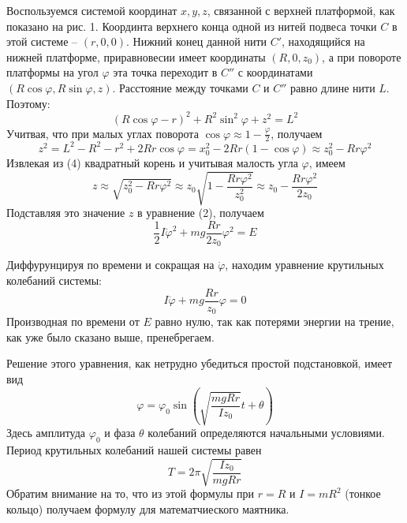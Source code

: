 \documentclass[a4paper,12pt]{article} %
\begin{document}
Воспользуемся системой координат $x, y, z$, связанной с верхней платформой, как показано на рис. 1. Координта верхнего конца одной из нитей подвеса точки $C$ в этой системе -- $(r, 0, 0)$. Нижний конец данной нити $C'$, находящийся на нижней платформе, приравновесии имеет координаты $(R, 0, z_0)$, а при повороте платформы на угол $\varphi$ эта точка переходит в $C''$ с координатами $(R\cos\varphi, R\sin\varphi, z)$. Расстояние между точками $C$ и $C''$ равно длине нити $L$. Поэтому:
\begin{equation}
(R\cos\varphi-r)^2 + R^2\sin^2\varphi + z^2 = L^2
\end{equation}
Учитвая, что при малых углах поворота $\cos\varphi\approx 1 - \frac{\varphi}{2}$, получаем 
\begin{equation}
z^2 = L^2 - R^2 - r^2 + 2Rr\cos\varphi = x_0^2 - 2Rr(1-\cos\varphi) \approx z_0^2 - Rr\varphi^2
\end{equation}
Извлекая из (4) квадратный корень и учитывая малость угла $\varphi$, имеем
\begin{equation}
z \approx \sqrt{z_0^2 - Rr\varphi^2}\approx z_0\sqrt{1 - \frac{Rr\varphi^2}{z_0^2}}\approx z_0 - \frac{Rr\varphi^2}{2z_0}
\end{equation}
Подставляя это значение $z$ в уравнение (2), получаем
\begin{equation}
\frac{1}{2}I\dot\varphi^2 + mg\frac{Rr}{2z_0}\varphi^2 = E
\end{equation}

Диффурунцируя по времени и сокращая на $\dot{\varphi}$, находим уравнение крутильных колебаний системы:
\begin{equation}
I\ddot{\varphi}+mg\frac{Rr}{z_0}\varphi = 0
\end{equation}
Производная по времени от $E$ равно нулю, так как потерями энергии на трение, как уже было сказано выше, пренебрегаем.

Решение этого уравнения, как нетрудно убедиться простой подстановкой, имеет вид
\begin{equation}
\varphi = \varphi_0\sin\left(\sqrt{\frac{mgRr}{Iz_0}}t+\theta\right)
\end{equation}
Здесь амплитуда $\varphi_0$ и фаза $\theta$ колебаний определяются начальными условиями. Период крутильных колебаний нашей системы равен
\begin{equation}
T = 2\pi\sqrt{\frac{Iz_0}{mgRr}}
\end{equation}
Обратим внимание на то, что из этой формулы при $r = R$ и $I = mR^2$ (тонкое кольцо) получаем формулу для математчиеского маятника.
\end{document}
